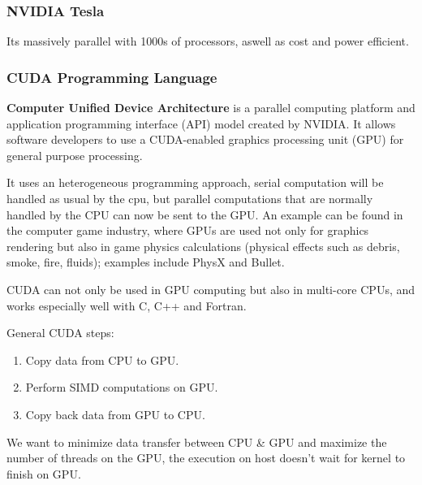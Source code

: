\subsubsection{NVIDIA Tesla}
Its massively parallel with 1000s of processors,  aswell as cost and power efficient.


\subsubsection{CUDA Programming Language}
\textbf{Computer Unified Device Architecture} is a parallel computing platform and application programming interface (API) model created by NVIDIA. It allows software developers to use a CUDA-enabled graphics processing unit (GPU) for general purpose processing.

It uses an heterogeneous programming approach, serial computation will be handled as usual by the cpu, but parallel computations that are normally handled by the CPU can now be sent to the GPU. An example can be found in the computer game industry, where GPUs are used not only for graphics rendering but also in game physics calculations (physical effects such as debris, smoke, fire, fluids); examples include PhysX and Bullet.

CUDA can not only be used in GPU computing but also in multi-core CPUs, and works especially well with C, C++ and Fortran.

General CUDA steps:
\begin{enumerate}
  \item Copy data from CPU to GPU.
  \item Perform SIMD computations on GPU.
  \item Copy back data from GPU to CPU.
\end{enumerate}

We want to minimize data transfer between CPU \& GPU and maximize the number of threads on the GPU, the execution on host doesn't wait for kernel to finish on GPU.
